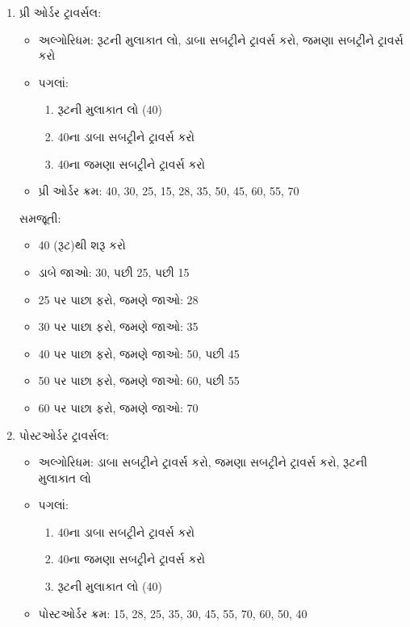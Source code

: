 \begin{enumerate}
\def\labelenumi{\arabic{enumi}.}
\tightlist
\item
  પ્રી ઓર્ડર ટ્રાવર્સલ:

  \begin{itemize}
  \tightlist
  \item
    અલ્ગોરિધમ: રૂટની મુલાકાત લો, ડાબા સબટ્રીને ટ્રાવર્સ કરો, જમણા સબટ્રીને ટ્રાવર્સ
    કરો
  \item
    પગલાં:

    \begin{enumerate}
    \def\labelenumii{\arabic{enumii}.}
    \tightlist
    \item
      રૂટની મુલાકાત લો (40)
    \item
      40ના ડાબા સબટ્રીને ટ્રાવર્સ કરો
    \item
      40ના જમણા સબટ્રીને ટ્રાવર્સ કરો
    \end{enumerate}
  \item
    પ્રી ઓર્ડર ક્રમ: 40, 30, 25, 15, 28, 35, 50, 45, 60, 55, 70
  \end{itemize}

  સમજૂતી:

  \begin{itemize}
  \tightlist
  \item
    40 (રૂટ)થી શરૂ કરો
  \item
    ડાબે જાઓ: 30, પછી 25, પછી 15
  \item
    25 પર પાછા ફરો, જમણે જાઓ: 28
  \item
    30 પર પાછા ફરો, જમણે જાઓ: 35
  \item
    40 પર પાછા ફરો, જમણે જાઓ: 50, પછી 45
  \item
    50 પર પાછા ફરો, જમણે જાઓ: 60, પછી 55
  \item
    60 પર પાછા ફરો, જમણે જાઓ: 70
  \end{itemize}
\item
  પોસ્ટઓર્ડર ટ્રાવર્સલ:

  \begin{itemize}
  \tightlist
  \item
    અલ્ગોરિધમ: ડાબા સબટ્રીને ટ્રાવર્સ કરો, જમણા સબટ્રીને ટ્રાવર્સ કરો, રૂટની
    મુલાકાત લો
  \item
    પગલાં:

    \begin{enumerate}
    \def\labelenumii{\arabic{enumii}.}
    \tightlist
    \item
      40ના ડાબા સબટ્રીને ટ્રાવર્સ કરો
    \item
      40ના જમણા સબટ્રીને ટ્રાવર્સ કરો
    \item
      રૂટની મુલાકાત લો (40)
    \end{enumerate}
  \item
    પોસ્ટઓર્ડર ક્રમ: 15, 28, 25, 35, 30, 45, 55, 70, 60, 50, 40
  \end{itemize}


\end{enumerate}
